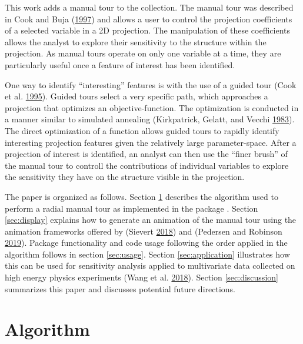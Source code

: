 This work adds a manual tour to the collection. The manual tour was
described in Cook and Buja
(\protect\hyperlink{ref-cook_manual_1997}{1997}) and allows a user to
control the projection coefficients of a selected variable in a 2D
projection. The manipulation of these coefficients allows the analyst to
explore their sensitivity to the structure within the projection. As
manual tours operate on only one variable at a time, they are
particularly useful once a feature of interest has been identified.

One way to identify ``interesting'' features is with the use of a guided
tour (Cook et al. \protect\hyperlink{ref-cook_grand_1995}{1995}). Guided
tours select a very specific path, which approaches a projection that
optimizes an objective-function. The optimization is conducted in a
manner similar to simulated annealing (Kirkpatrick, Gelatt, and Vecchi
\protect\hyperlink{ref-kirkpatrick_optimization_1983}{1983}). The direct
optimization of a function allows guided tours to rapidly identify
interesting projection features given the relatively large
parameter-space. After a projection of interest is identified, an
analyst can then use the ``finer brush'' of the manual tour to controll
the contributions of individual variables to explore the sensitivity
they have on the structure visible in the projection.

The paper is organized as follows. Section \ref{sec:algorithm} describes
the algorithm used to perform a radial manual tour as implemented in the
package . Section \ref{sec:display} explains how to
generate an animation of the manual tour using the animation frameworks
offered by  (Sievert
\protect\hyperlink{ref-sievert_plotly_2018}{2018}) and
 (Pedersen and Robinson
\protect\hyperlink{ref-pedersen_gganimate:_2019}{2019}). Package
functionality and code usage following the order applied in the
algorithm follows in section \ref{sec:usage}. Section
\ref{sec:application} illustrates how this can be used for sensitivity
analysis applied to multivariate data collected on high energy physics
experiments (Wang et al.
\protect\hyperlink{ref-wang_mapping_2018}{2018}). Section
\ref{sec:discussion} summarizes this paper and discusses potential
future directions.

\hypertarget{sec:algorithm}{%
\section{Algorithm}\label{sec:algorithm}}

